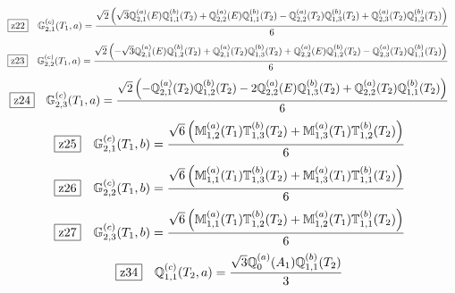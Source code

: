 \documentclass[fleqn,10pt,landscape]{jsarticle}
\begin{document}
\begin{dmath*}
\hspace*{3mm}\fbox{z22}\quad \mathbb{G}_{2,1}^{(c)}(T_{1},a)=\frac{\sqrt{2} \left(\sqrt{3} \mathbb{Q}_{2,1}^{(a)}(E) \mathbb{Q}_{1,1}^{(b)}(T_{2}) + \mathbb{Q}_{2,2}^{(a)}(E) \mathbb{Q}_{1,1}^{(b)}(T_{2}) - \mathbb{Q}_{2,2}^{(a)}(T_{2}) \mathbb{Q}_{1,3}^{(b)}(T_{2}) + \mathbb{Q}_{2,3}^{(a)}(T_{2}) \mathbb{Q}_{1,2}^{(b)}(T_{2})\right)}{6}
\end{dmath*}
\begin{dmath*}
\hspace*{3mm}\fbox{z23}\quad \mathbb{G}_{2,2}^{(c)}(T_{1},a)=\frac{\sqrt{2} \left(- \sqrt{3} \mathbb{Q}_{2,1}^{(a)}(E) \mathbb{Q}_{1,2}^{(b)}(T_{2}) + \mathbb{Q}_{2,1}^{(a)}(T_{2}) \mathbb{Q}_{1,3}^{(b)}(T_{2}) + \mathbb{Q}_{2,2}^{(a)}(E) \mathbb{Q}_{1,2}^{(b)}(T_{2}) - \mathbb{Q}_{2,3}^{(a)}(T_{2}) \mathbb{Q}_{1,1}^{(b)}(T_{2})\right)}{6}
\end{dmath*}
\begin{dmath*}
\hspace*{3mm}\fbox{z24}\quad \mathbb{G}_{2,3}^{(c)}(T_{1},a)=\frac{\sqrt{2} \left(- \mathbb{Q}_{2,1}^{(a)}(T_{2}) \mathbb{Q}_{1,2}^{(b)}(T_{2}) - 2 \mathbb{Q}_{2,2}^{(a)}(E) \mathbb{Q}_{1,3}^{(b)}(T_{2}) + \mathbb{Q}_{2,2}^{(a)}(T_{2}) \mathbb{Q}_{1,1}^{(b)}(T_{2})\right)}{6}
\end{dmath*}
\begin{dmath*}
\hspace*{3mm}\fbox{z25}\quad \mathbb{G}_{2,1}^{(c)}(T_{1},b)=\frac{\sqrt{6} \left(\mathbb{M}_{1,2}^{(a)}(T_{1}) \mathbb{T}_{1,3}^{(b)}(T_{2}) + \mathbb{M}_{1,3}^{(a)}(T_{1}) \mathbb{T}_{1,2}^{(b)}(T_{2})\right)}{6}
\end{dmath*}
\begin{dmath*}
\hspace*{3mm}\fbox{z26}\quad \mathbb{G}_{2,2}^{(c)}(T_{1},b)=\frac{\sqrt{6} \left(\mathbb{M}_{1,1}^{(a)}(T_{1}) \mathbb{T}_{1,3}^{(b)}(T_{2}) + \mathbb{M}_{1,3}^{(a)}(T_{1}) \mathbb{T}_{1,1}^{(b)}(T_{2})\right)}{6}
\end{dmath*}
\begin{dmath*}
\hspace*{3mm}\fbox{z27}\quad \mathbb{G}_{2,3}^{(c)}(T_{1},b)=\frac{\sqrt{6} \left(\mathbb{M}_{1,1}^{(a)}(T_{1}) \mathbb{T}_{1,2}^{(b)}(T_{2}) + \mathbb{M}_{1,2}^{(a)}(T_{1}) \mathbb{T}_{1,1}^{(b)}(T_{2})\right)}{6}
\end{dmath*}
\begin{dmath*}
\hspace*{3mm}\fbox{z34}\quad \mathbb{Q}_{1,1}^{(c)}(T_{2},a)=\frac{\sqrt{3} \mathbb{Q}_{0}^{(a)}(A_{1}) \mathbb{Q}_{1,1}^{(b)}(T_{2})}{3}
\end{dmath*}
\end{document}
